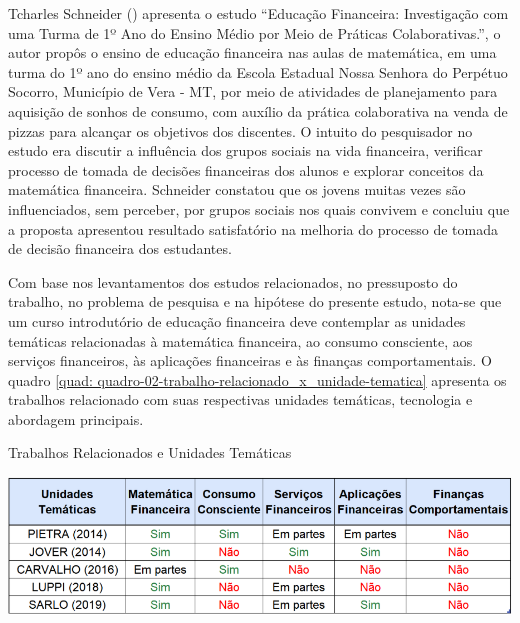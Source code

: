 Tcharles Schneider (\citeyear{schneider2019}) apresenta o estudo “Educação Financeira: Investigação com uma Turma de 1º Ano do Ensino Médio por Meio de Práticas Colaborativas.”, o autor propôs o ensino de educação financeira nas aulas de matemática, em uma turma do 1º ano do ensino médio da Escola Estadual Nossa Senhora do Perpétuo Socorro, Município de Vera - MT, por meio de atividades de planejamento para aquisição de sonhos de consumo, com auxílio da prática colaborativa na venda de pizzas para alcançar os objetivos dos discentes. O intuito do pesquisador no estudo era discutir a influência dos grupos sociais na vida financeira, verificar processo de tomada de decisões financeiras dos alunos e explorar conceitos da matemática financeira. Schneider constatou que os jovens muitas vezes são influenciados, sem perceber, por grupos sociais nos quais convivem e concluiu que a proposta apresentou resultado satisfatório na melhoria do processo de tomada de decisão financeira dos estudantes.

Com base nos levantamentos dos estudos relacionados, no pressuposto do trabalho, no problema de pesquisa e na hipótese do presente estudo, nota-se que um curso introdutório de educação financeira deve contemplar as unidades temáticas relacionadas à matemática financeira, ao consumo consciente, aos serviços financeiros, às aplicações financeiras e às finanças comportamentais. O quadro \ref{quad: quadro-02-trabalho-relacionado_x_unidade-tematica} apresenta os trabalhos relacionado com suas respectivas unidades temáticas, tecnologia e abordagem principais.

\graphicspath{{quadros/}}
\begin{quadro}[!ht]
\centering
\begin{minipage}{1\textwidth}
\caption{Trabalhos Relacionados e Unidades Temáticas}
\centering
\includegraphics[width=1\textwidth]{quadro-02-trabalhos-relacionados_x_unidades-tema}
\label{quad: quadro-02-trabalho-relacionado_x_unidade-tematica}
\end{minipage}
\end{quadro}

